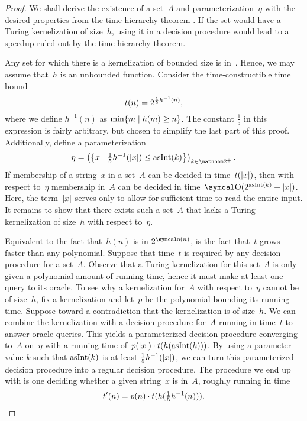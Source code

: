 \begin{proof}
  We shall derive the existence of a set~$A$ and parameterization~$\eta$ with the desired properties from the time hierarchy theorem \parencite{hartmanis1965computational,hennie1966two-tape}.
  If the set would have a Turing kernelization of size~$h$, using it in a decision procedure would lead to a speedup ruled out by the time hierarchy theorem.

  Any set for which there is a kernelization of bounded size is in~.
  Hence, we may assume that~$h$ is an unbounded function.
  Consider the time-constructible time bound
  \begin{equation*}
    t(n) = 2^{\frac{1}{5} h^{-1}(n)},
  \end{equation*}
  where we define $h^{-1}(n)$ as $\min\{m \;|\; h(m) \ge n\}$.
  The constant $\frac{1}{5}$ in this expression is fairly arbitrary, but chosen to simplify the last part of this proof.
  Additionally, define a parameterization
  \begin{equation*}
    \eta \deq \left(\left\{x \st[\middle] \tfrac{1}{5} h^{-1}(\length{x}) \le \asNat(k)\right\}\right)_{k \in \binary^+}.
  \end{equation*}
  If membership of a string~$x$ in a set~$A$ can be decided in time~$t({\lvert x\rvert})$, then with respect to~$\eta$ membership in~$A$ can be decided in time~$\bigO(2^{\asNat(k)} + \length{x})$.
  Here, the term~${\lvert x\rvert}$ serves only to allow for sufficient time to read the entire input.
  It remains to show that there exists such a set~$A$ that lacks a Turing kernelization of size~$h$ with respect to~$\eta$.

  Equivalent to the fact that~$h(n)$ is in $2^{\littleo(n)}$, is the fact that~$t$ grows faster than any polynomial.
  Suppose that time~$t$ is required  by any decision procedure for a set~$A$.
  Observe that a Turing kernelization for this set~$A$ is only given a polynomial amount of running time, hence it must make at least one query to its oracle.
  To see why a kernelization for~$A$ with respect to~$\eta$ cannot be of size~$h$, fix a kernelization and let~$p$ be the polynomial bounding its running time.
  Suppose toward a contradiction that the kernelization is of size~$h$.
  We can combine the kernelization with a decision procedure for~$A$ running in time~$t$ to answer oracle queries.
  This yields a parameterized decision procedure converging to~$A$ on~$\eta$ with a running time of~$p({\lvert x\rvert}) \cdot t(h(\operatorname{asInt}(k)))$.
  By using a parameter value $k$ such that $\operatorname{asInt}(k)$ is at least $\frac{1}{5} h^{-1}({\lvert x\rvert})$, we can turn this parameterized decision procedure into a regular decision procedure.
  The procedure we end up with is one deciding whether a given string~$x$ is in~$A$, roughly running in time
  \begin{equation*}
    t'(n) = p(n) \cdot t(h(\tfrac{1}{5} h^{-1}(n))).
  \end{equation*}


\end{proof}
